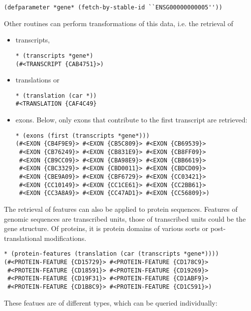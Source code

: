 \documentclass{book}
\begin{document}
\begin{lstlisting}
(defparameter *gene* (fetch-by-stable-id ``ENSG00000000005''))
\end{lstlisting}

Other routines can perform transformations of this data, i.e. the retrieval of
\begin{itemize}
\item transcripts,

\begin{lstlisting}
* (transcripts *gene*)
(#<TRANSCRIPT {CAB4751}>)
\end{lstlisting}

\item translations or

\begin{lstlisting}
* (translation (car *))
#<TRANSLATION {CAF4C49}
\end{lstlisting}

\item exons. Below, only exons that contribute to the first transcript are retrieved:
\begin{lstlisting}
* (exons (first (transcripts *gene*)))
(#<EXON {CB4F9E9}> #<EXON {CB5C809}> #<EXON {CB69539}>
 #<EXON {CB76249}> #<EXON {CB831E9}> #<EXON {CB8FF09}>
 #<EXON {CB9CC09}> #<EXON {CBA98E9}> #<EXON {CBB6619}>
 #<EXON {CBC3329}> #<EXON {CBD0011}> #<EXON {CBDCD09}>
 #<EXON {CBE9A09}> #<EXON {CBF6729}> #<EXON {CC03421}>
 #<EXON {CC10149}> #<EXON {CC1CE61}> #<EXON {CC2BB61}>
 #<EXON {CC3A8A9}> #<EXON {CC47AD1}> #<EXON {CC56809}>)
\end{lstlisting}
\end{itemize}

The retrieval of features can also be applied to protein sequences. Features of
genomic sequences are transcribed units, those of transcribed units could be the
gene structure. Of proteins, it is protein domains of various sorts or
post-translational modifications.

\begin{lstlisting}
* (protein-features (translation (car (transcripts *gene*))))
(#<PROTEIN-FEATURE {CD15729}> #<PROTEIN-FEATURE {CD178C9}>
 #<PROTEIN-FEATURE {CD18591}> #<PROTEIN-FEATURE {CD19269}>
 #<PROTEIN-FEATURE {CD19F31}> #<PROTEIN-FEATURE {CD1ABF9}>
 #<PROTEIN-FEATURE {CD1B8C9}> #<PROTEIN-FEATURE {CD1C591}>)
\end{lstlisting}

These featues are of different types, which can be queried individually:
\end{document}
